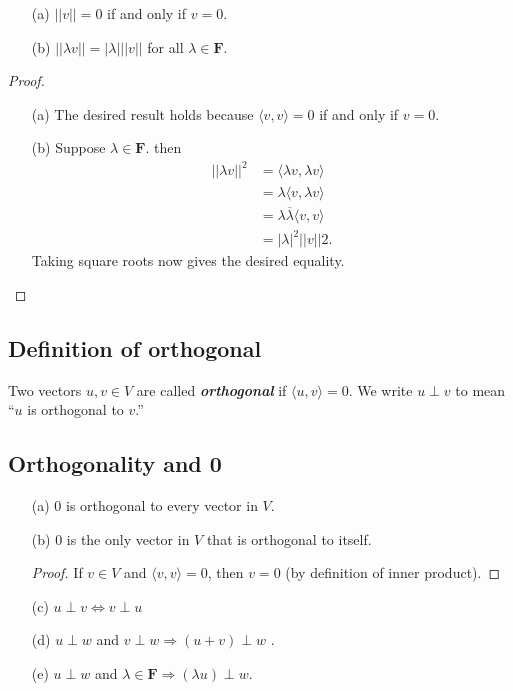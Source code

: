 \documentclass[11pt]{article}
\begin{document}
    \begin{enumerate}
        \item[(a)] \(||v|| = 0\) if and only if \(v = 0\). 
        \item[(b)] \(||\lambda v|| = |\lambda | ||v||\) for all \(\lambda \in \textbf{F}\).  
    \end{enumerate}
    \begin{proof}
        \begin{enumerate}
            \item[(a)] The desired result holds because \(\langle v,v \rangle = 0\) if and only if \(v = 0\).
            \item[(b)] Suppose \(\lambda \in \textbf{F}\). then
            \begin{align*}
                ||\lambda v||^2 &= \langle \lambda v, \lambda v \rangle \\
                                &= \lambda \langle v, \lambda v \rangle \\
                                &= \lambda \overline{\lambda} \langle v,v \rangle \\
                                &= |\lambda|^2 || v || 2.
            \end{align*}   
            Taking square roots now gives the desired equality. 
        \end{enumerate}
    \end{proof}

    \subsection{Definition of orthogonal}

    Two vectors \(u,v \in V\) are called \textbf{\emph{orthogonal}} if \(\langle u,v \rangle = 0\). We write \(u \perp v\) to mean ``$u$ is orthogonal to $v$.''

    \subsection{Orthogonality and 0}
    \begin{enumerate}
        \item[(a)] 0 is orthogonal to every vector in $V$.
        \item[(b)] 0 is the only vector in $V$ that is orthogonal to itself. 
        \begin{proof}
            If \(v \in V\) and \(\langle v,v \rangle = 0\), then \(v = 0\) (by definition of inner product).
        \end{proof}   
        \item[(c)] \(u \perp v \Leftrightarrow v \perp u\)
        \item[(d)] \(u \perp w\) and \(v \perp w \Rightarrow (u+v) \perp w\)  .
        \item[(e)] \(u \perp w\) and \(\lambda \in \textbf{F} \Rightarrow (\lambda u) \perp w\).   
    \end{enumerate}
\end{document}
